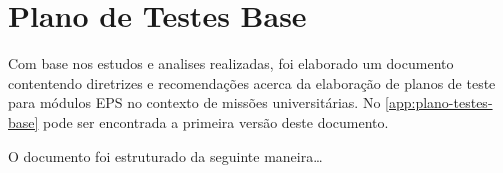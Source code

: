 \chapter{Plano de Testes Base}

Com base nos estudos e analises realizadas, foi elaborado um documento contentendo diretrizes e recomendações acerca da elaboração de planos de teste para módulos \gls{EPS} no contexto de missões universitárias.
No \autoref{app:plano-testes-base} pode ser encontrada a primeira versão deste documento.

O documento foi estruturado da seguinte maneira\dots